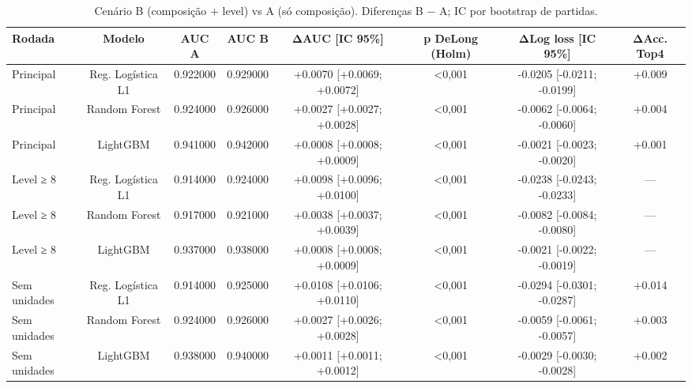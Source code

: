\begin{table}[htbp]
\caption{Cenário B (composição + level) vs A (só composição). Diferenças B − A; IC por bootstrap de partidas.}
\label{tab:abperf}
\centering
\small
\begin{tabular}{lccccccc}
\toprule
Rodada & Modelo & AUC A & AUC B & ΔAUC [IC 95\%] & p DeLong (Holm) & ΔLog loss [IC 95\%] & ΔAcc. Top4 \\
\midrule
Principal & Reg. Logística L1 & 0.922000 & 0.929000 & +0.0070 [+0.0069; +0.0072] & <0,001 & -0.0205 [-0.0211; -0.0199] & +0.009 \\
Principal & Random Forest & 0.924000 & 0.926000 & +0.0027 [+0.0027; +0.0028] & <0,001 & -0.0062 [-0.0064; -0.0060] & +0.004 \\
Principal & LightGBM & 0.941000 & 0.942000 & +0.0008 [+0.0008; +0.0009] & <0,001 & -0.0021 [-0.0023; -0.0020] & +0.001 \\
Level ≥ 8 & Reg. Logística L1 & 0.914000 & 0.924000 & +0.0098 [+0.0096; +0.0100] & <0,001 & -0.0238 [-0.0243; -0.0233] & — \\
Level ≥ 8 & Random Forest & 0.917000 & 0.921000 & +0.0038 [+0.0037; +0.0039] & <0,001 & -0.0082 [-0.0084; -0.0080] & — \\
Level ≥ 8 & LightGBM & 0.937000 & 0.938000 & +0.0008 [+0.0008; +0.0009] & <0,001 & -0.0021 [-0.0022; -0.0019] & — \\
Sem unidades & Reg. Logística L1 & 0.914000 & 0.925000 & +0.0108 [+0.0106; +0.0110] & <0,001 & -0.0294 [-0.0301; -0.0287] & +0.014 \\
Sem unidades & Random Forest & 0.924000 & 0.926000 & +0.0027 [+0.0026; +0.0028] & <0,001 & -0.0059 [-0.0061; -0.0057] & +0.003 \\
Sem unidades & LightGBM & 0.938000 & 0.940000 & +0.0011 [+0.0011; +0.0012] & <0,001 & -0.0029 [-0.0030; -0.0028] & +0.002 \\
\bottomrule
\end{tabular}
\end{table}
